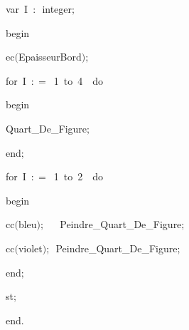 {\pagebreak[3] 
\vspace{\neglskip}\mbox{\blc  \blk\idt  \mcl var\idt \ I\ $:$\ integer$;$}\par 
\medskip

\vspace{\neglskip}\mbox{\blc  \idt  \mcl begin\idt }\par 
\vspace{\neglskip}\mbox{\blc  \blk\idt  ec$($EpaisseurBord$)$$;$}\par 
\pagebreak[3] 
\vspace{\neglskip}\mbox{\blc  \blk\idt  \mcl for\idt \ I\ $:$$=$\ 1\ \mcl to\idt \ 4\ \ \mcl do\idt }\par 
\vspace{\neglskip}\mbox{\blc  \blk\blk\idt  \mcl begin\idt }\par 
\vspace{\neglskip}\mbox{\blc  \blk\blk\blk\idt  Quart\_De\_Figure$;$}\par 
\vspace{\neglskip}\mbox{\blc  \blk\blk\idt  \mcl end\idt $;$}\par 
\pagebreak[3] 
\vspace{\neglskip}\mbox{\blc  \blk\idt  \mcl for\idt \ I\ $:$$=$\ 1\ \mcl to\idt \ 2\ \ \mcl do\idt }\par 
\vspace{\neglskip}\mbox{\blc  \blk\blk\idt  \mcl begin\idt }\par 
\vspace{\neglskip}\mbox{\blc  \blk\blk\blk\idt  cc$($bleu$)$$;$\ \ \ Peindre\_Quart\_De\_Figure$;$}\par 
\vspace{\neglskip}\mbox{\blc  \blk\blk\blk\idt  cc$($violet$)$$;$\ Peindre\_Quart\_De\_Figure$;$}\par 
\vspace{\neglskip}\mbox{\blc  \blk\blk\idt  \mcl end\idt $;$}\par 
\vspace{\neglskip}\mbox{\blc  \blk\idt  st$;$}\par 
\vspace{\neglskip}\mbox{\blc  \idt  \mcl end\idt $.$}\par 

\medskip }

